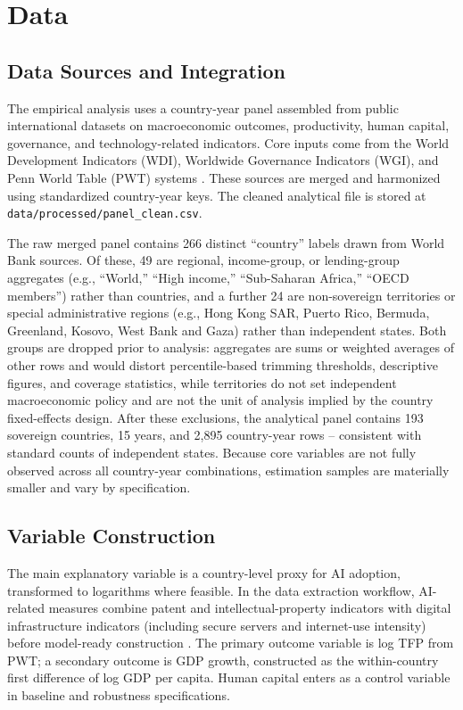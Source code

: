 \section{Data}

\subsection{Data Sources and Integration}

The empirical analysis uses a country-year panel assembled from public international datasets on macroeconomic outcomes, productivity, human capital, governance, and technology-related indicators. Core inputs come from the World Development Indicators (WDI), Worldwide Governance Indicators (WGI), and Penn World Table (PWT) systems \cite{worldbankWDI2024,kaufmannKraayMastruzzi2010,feenstraInklaarTimmer2015}. These sources are merged and harmonized using standardized country-year keys. The cleaned analytical file is stored at \texttt{data/processed/panel\_clean.csv}.

The raw merged panel contains 266 distinct ``country'' labels drawn from World Bank sources. Of these, 49 are regional, income-group, or lending-group aggregates (e.g., ``World,'' ``High income,'' ``Sub-Saharan Africa,'' ``OECD members'') rather than countries, and a further 24 are non-sovereign territories or special administrative regions (e.g., Hong Kong SAR, Puerto Rico, Bermuda, Greenland, Kosovo, West Bank and Gaza) rather than independent states. Both groups are dropped prior to analysis: aggregates are sums or weighted averages of other rows and would distort percentile-based trimming thresholds, descriptive figures, and coverage statistics, while territories do not set independent macroeconomic policy and are not the unit of analysis implied by the country fixed-effects design. After these exclusions, the analytical panel contains 193 sovereign countries, 15 years, and 2,895 country-year rows -- consistent with standard counts of independent states. Because core variables are not fully observed across all country-year combinations, estimation samples are materially smaller and vary by specification.

\subsection{Variable Construction}

The main explanatory variable is a country-level proxy for AI adoption, transformed to logarithms where feasible. In the data extraction workflow, AI-related measures combine patent and intellectual-property indicators with digital infrastructure indicators (including secure servers and internet-use intensity) before model-ready construction \cite{worldbankWDI2024}. The primary outcome variable is log TFP from PWT; a secondary outcome is GDP growth, constructed as the within-country first difference of log GDP per capita. Human capital enters as a control variable in baseline and robustness specifications.

